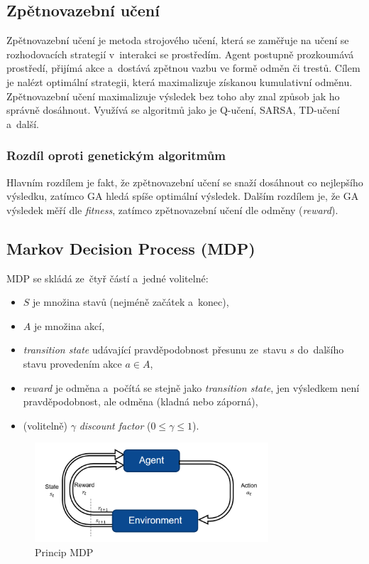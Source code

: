 \subsection{Zpětnovazební učení}

Zpětnovazební učení je metoda strojového učení, která se zaměřuje na učení se rozhodovacích strategií v~interakci se prostředím. Agent postupně prozkoumává prostředí, přijímá akce a~dostává zpětnou vazbu ve formě odměn či trestů. Cílem je nalézt optimální strategii, která maximalizuje získanou kumulativní odměnu. Zpětnovazební učení maximalizuje výsledek bez toho aby znal způsob jak ho správně dosáhnout.
Využívá se algoritmů jako je Q-učení, SARSA, TD-učení a~další.

\subsubsection{Rozdíl oproti genetickým algoritmům}

Hlavním rozdílem je fakt, že zpětnovazební učení se snaží dosáhnout co nejlepšího výsledku, zatímco GA hledá spíše optimální výsledek.
Dalším rozdílem je, že GA výsledek měří dle \emph{fitness}, zatímco zpětnovazební učení dle odměny (\emph{reward}).

\subsection{Markov Decision Process (MDP)}

MDP se skládá ze~čtyř částí a~jedné volitelné:
\begin{itemize}
    \item $S$ je množina stavů (nejméně začátek a~konec),
    \item $A$ je množina akcí,
    \item \emph{transition state} udávající pravděpodobnost přesunu ze~stavu $s$ do~dalšího stavu provedením akce $a \in A$,
    \item \emph{reward} je odměna a~počítá se stejně jako \emph{transition state}, jen výsledkem není pravděpodobnost, ale odměna (kladná nebo záporná),
    \item (volitelně) $\gamma$ \emph{discount factor} ($0 \leq \gamma \leq 1$).
\end{itemize}

\begin{figure}[h]
    \centering
    \includegraphics[height=10em]{images/10_MDP.png}
    \caption{Princip MDP}
    \label{mdp}
\end{figure}

